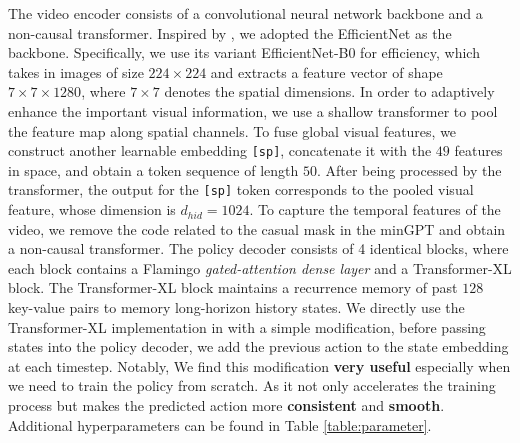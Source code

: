 \documentclass[11pt, a4paper, logo, one column]{craftjarvis}
\begin{document}
The video encoder consists of a convolutional neural network backbone and a non-causal transformer. Inspired by \cite{rt-1}, we adopted the EfficientNet \citep{eff} as the backbone. Specifically, we use its variant EfficientNet-B0 for efficiency, which takes in images of size $224 \times 224$ and extracts a feature vector of shape $7 \times 7 \times 1280$, where $7 \times 7$ denotes the spatial dimensions. In order to adaptively enhance the important visual information, we use a shallow transformer to pool the feature map along spatial channels. To fuse global visual features, we construct another learnable embedding \texttt{[sp]}, concatenate it with the $49$ features in space, and obtain a token sequence of length $50$. After being processed by the transformer, the output for the \texttt{[sp]} token corresponds to the pooled visual feature, whose dimension is $d_{hid}=1024$. To capture the temporal features of the video, we remove the code related to the casual mask in the minGPT and obtain a non-causal transformer. 
The policy decoder consists of 4 identical blocks, where each block contains a Flamingo \emph{gated-attention dense layer} \citep{flamingo} and a Transformer-XL block\citep{transformerxl}. The Transformer-XL block maintains a recurrence memory of past $128$ key-value pairs to memory long-horizon history states. We directly use the Transformer-XL implementation in \cite{vpt} with a simple modification, \ie before passing states into the policy decoder, we add the previous action to the state embedding at each timestep. Notably, We find this modification \textbf{very useful} especially when we need to train the policy from scratch. As it not only accelerates the training process but makes the predicted action more \textbf{consistent} and \textbf{smooth}. Additional hyperparameters can be found in Table \ref{table:parameter}. 

\end{document}
